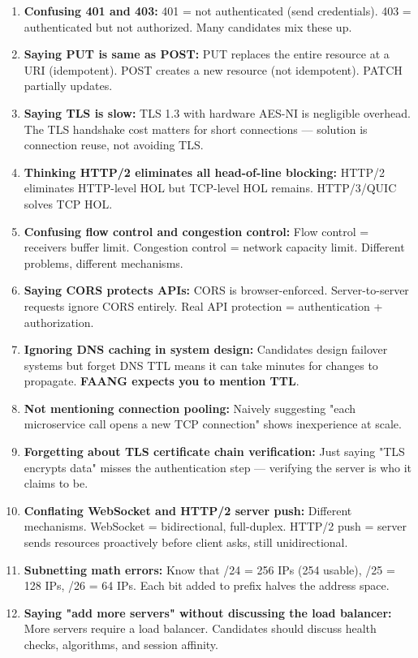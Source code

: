 \documentclass[11pt]{article}
\begin{document}
\begin{enumerate}
\def\labelenumi{\arabic{enumi}.}
\item
  \textbf{Confusing 401 and 403:} 401 = not authenticated (send credentials). 403 = authenticated but not authorized. Many candidates mix these up.
\item
  \textbf{Saying PUT is same as POST:} PUT replaces the entire resource at a URI (idempotent). POST creates a new resource (not idempotent). PATCH partially updates.
\item
  \textbf{Saying TLS is slow:} TLS 1.3 with hardware AES-NI is negligible overhead. The TLS handshake cost matters for short connections --- solution is connection reuse, not avoiding TLS.
\item
  \textbf{Thinking HTTP/2 eliminates all head-of-line blocking:} HTTP/2 eliminates HTTP-level HOL but TCP-level HOL remains. HTTP/3/QUIC solves TCP HOL.
\item
  \textbf{Confusing flow control and congestion control:} Flow control = receiver\textquotesingle s buffer limit. Congestion control = network capacity limit. Different problems, different mechanisms.
\item
  \textbf{Saying CORS protects APIs:} CORS is browser-enforced. Server-to-server requests ignore CORS entirely. Real API protection = authentication + authorization.
\item
  \textbf{Ignoring DNS caching in system design:} Candidates design failover systems but forget DNS TTL means it can take minutes for changes to propagate. \textbf{FAANG expects you to mention TTL}.
\item
  \textbf{Not mentioning connection pooling:} Naively suggesting "each microservice call opens a new TCP connection" shows inexperience at scale.
\item
  \textbf{Forgetting about TLS certificate chain verification:} Just saying "TLS encrypts data" misses the authentication step --- verifying the server is who it claims to be.
\item
  \textbf{Conflating WebSocket and HTTP/2 server push:} Different mechanisms. WebSocket = bidirectional, full-duplex. HTTP/2 push = server sends resources proactively before client asks, still unidirectional.
\item
  \textbf{Subnetting math errors:} Know that /24 = 256 IPs (254 usable), /25 = 128 IPs, /26 = 64 IPs. Each bit added to prefix halves the address space.
\item
  \textbf{Saying "add more servers" without discussing the load balancer:} More servers require a load balancer. Candidates should discuss health checks, algorithms, and session affinity.
\end{enumerate}
\end{document}
